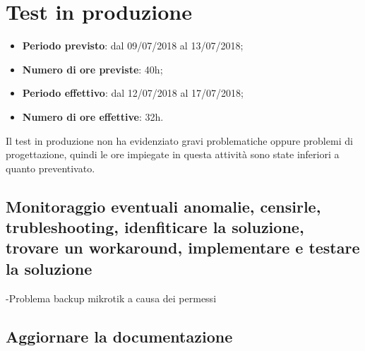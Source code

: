\documentclass[Realizzazione.tex]{subfiles}
\begin{document}
\section{Test in produzione}
\begin{itemize}
	\item \textbf{Periodo previsto}: dal 09/07/2018 al 13/07/2018;
	\item \textbf{Numero di ore previste}: 40h;
	\item \textbf{Periodo effettivo}: dal 12/07/2018 al 17/07/2018;
	\item \textbf{Numero di ore effettive}: 32h.
\end{itemize}
Il test in produzione non ha evidenziato gravi problematiche oppure problemi di progettazione, quindi le ore impiegate in questa attività sono state inferiori a quanto preventivato.

\subsection{Monitoraggio eventuali anomalie, censirle, trubleshooting, idenfiticare la soluzione, trovare un workaround, implementare e testare la soluzione}
-Problema backup mikrotik a causa dei permessi


\subsection{Aggiornare la documentazione}
\end{document}
